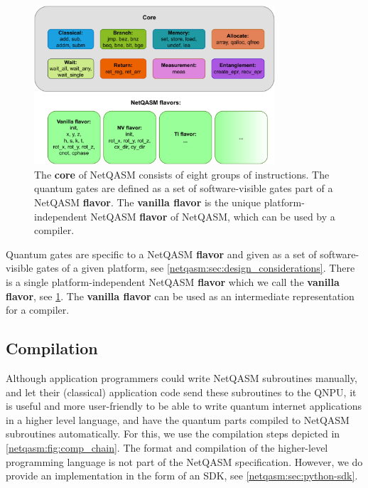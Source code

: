 \begin{figure}
      \centering
      \includegraphics[width=0.8\textwidth]{figures/netqasm/instructions.pdf}
      \caption{The \textbf{core} of \ac{NetQASM} consists of eight groups of
            instructions. The quantum gates are defined as a set of software-visible
            gates part of a \ac{NetQASM} \textbf{flavor}. The \textbf{vanilla flavor}
            is the unique platform-independent \ac{NetQASM} \textbf{flavor} of
            \ac{NetQASM}, which can be used by a compiler.}\label{netqasm:fig:instructions}
\end{figure}

Quantum gates are specific to a \ac{NetQASM} \textbf{flavor} and given as a set of software-visible gates of a given platform, see \cref{netqasm:sec:design_considerations}.
There is a single platform-independent \ac{NetQASM} \textbf{flavor} which we call the \textbf{vanilla flavor}, see \cref{netqasm:fig:instructions}.
The \textbf{vanilla flavor} can be used as an intermediate representation for a compiler.


\subsection{Compilation}
Although application programmers could write \ac{NetQASM} subroutines manually, and let their (classical) application code send these subroutines to the \ac{QNPU}, it is useful and more user-friendly to be able to write quantum internet applications in a higher level language, and have the quantum parts compiled to \ac{NetQASM} subroutines automatically.
For this, we use the compilation steps depicted in \cref{netqasm:fig:comp_chain}.
The format and compilation of the higher-level programming language is not part of the \ac{NetQASM} specification.
However, we do provide an implementation in the form of an SDK, see \cref{netqasm:sec:python-sdk}.

